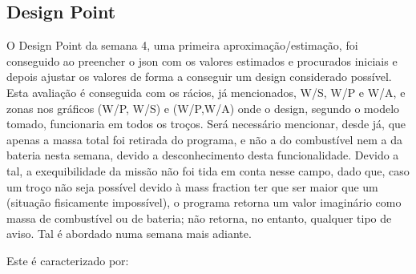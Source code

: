 \subsection{Design Point}
O Design Point da semana 4, uma primeira aproximação/estimação, foi conseguido ao preencher o json com os valores estimados e procurados iniciais e depois ajustar os valores de forma a conseguir um design considerado possível. Esta avaliação é conseguida com os rácios, já mencionados, W/S, W/P e W/A, e zonas nos gráficos (W/P, W/S) e (W/P,W/A) onde o design, segundo o modelo tomado, funcionaria em todos os troços. Será necessário mencionar, desde já, que apenas a massa total foi retirada do programa, e não a do combustível nem a da bateria nesta semana, devido a desconhecimento desta funcionalidade. Devido a tal, a exequibilidade da missão não foi tida em conta nesse campo, dado que, caso um troço não seja possível devido à mass fraction ter que ser maior que um (situação fisicamente impossível), o programa retorna um valor imaginário como massa de combustível ou de bateria; não retorna, no entanto, qualquer tipo de aviso. Tal é abordado numa semana mais adiante.\par
Este é caracterizado por:\par
\FloatBarrier

